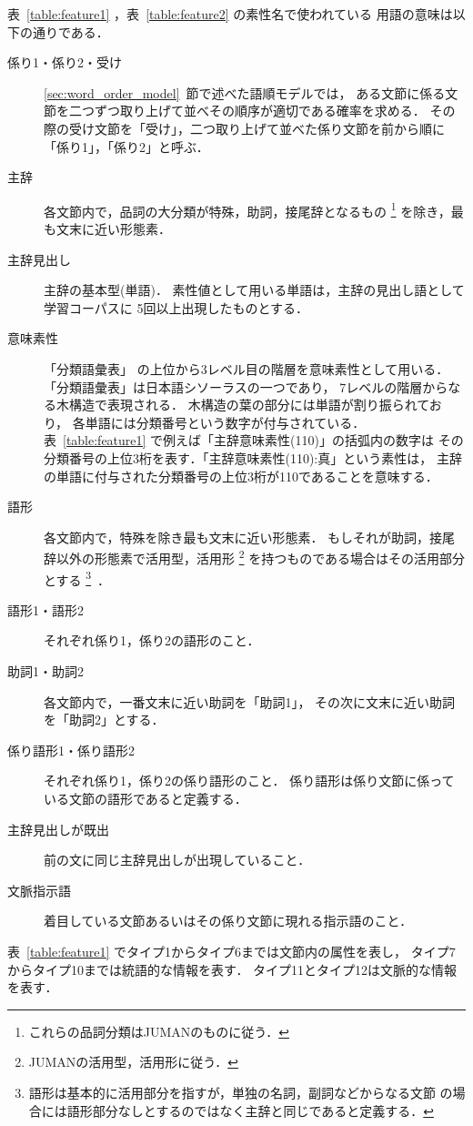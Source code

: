 表~\ref{table:feature1} ，表~\ref{table:feature2} の素性名で使われている
用語の意味は以下の通りである．
\begin{description}
\item[係り1・係り2・受け] \ref{sec:word_order_model}~節で述べた語順モデルでは，
  ある文節に係る文節を二つずつ取り上げて並べその順序が適切である確率を求める．
  その際の受け文節を「受け」，二つ取り上げて並べた係り文節を前から順に
  「係り1」，「係り2」と呼ぶ．
\item[主辞] 各文節内で，品詞の大分類が特殊，助詞，接尾辞となるもの
  \footnote{これらの品詞分類はJUMAN\cite{JUMAN3.5}のものに従う．}
  を除き，最も文末に近い形態素．
\item[主辞見出し] 主辞の基本型(単語)．
  素性値として用いる単語は，主辞の見出し語として学習コーパスに
  5回以上出現したものとする．
\item[意味素性] 「分類語彙表」\cite{NLRI64aj}
  の上位から3レベル目の階層を意味素性として用いる．
  「分類語彙表」は日本語シソーラスの一つであり，
  7レベルの階層からなる木構造で表現される．
  木構造の葉の部分には単語が割り振られており，
  各単語には分類番号という数字が付与されている．
  表~\ref{table:feature1} で例えば「主辞意味素性(110)」の括弧内の数字は
  その分類番号の上位3桁を表す．「主辞意味素性(110):真」という素性は，
  主辞の単語に付与された分類番号の上位3桁が110であることを意味する．
\item[語形] 各文節内で，特殊を除き最も文末に近い形態素．
  もしそれが助詞，接尾辞以外の形態素で活用型，活用形
  \footnote{JUMANの活用型，活用形に従う．}
  を持つものである場合はその活用部分とする
  \footnote{
    語形は基本的に活用部分を指すが，単独の名詞，副詞などからなる文節
    の場合には語形部分なしとするのではなく主辞と同じであると定義する．
    }~．
\item[語形1・語形2] それぞれ係り1，係り2の語形のこと．
\item[助詞1・助詞2] 各文節内で，一番文末に近い助詞を「助詞1」，
  その次に文末に近い助詞を「助詞2」とする．
\item[係り語形1・係り語形2] それぞれ係り1，係り2の係り語形のこと．
  係り語形は係り文節に係っている文節の語形であると定義する．
\item[主辞見出しが既出] 前の文に同じ主辞見出しが出現していること．
\item[文脈指示語] 着目している文節あるいはその係り文節に現れる指示語のこと．
\end{description}

表~\ref{table:feature1} でタイプ1からタイプ6までは文節内の属性を表し，
タイプ7からタイプ10までは統語的な情報を表す．
タイプ11とタイプ12は文脈的な情報を表す．

